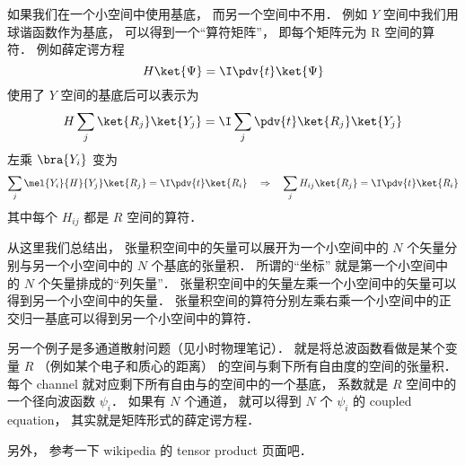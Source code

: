 如果我们在一个小空间中使用基底， 而另一个空间中不用． 例如 $Y$ 空间中我们用球谐函数作为基底， 可以得到一个“算符矩阵”， 即每个矩阵元为 R 空间的算符． 例如薛定谔方程
\begin{equation}
H \ket{\Psi} = \I \pdv{t}  \ket{\Psi}
\end{equation}
使用了 $Y$ 空间的基底后可以表示为
\begin{equation}
H \sum_j \ket{R_j}\ket{Y_j} =  \I  \sum_j\pdv{t}  \ket{R_j}\ket{Y_j}
\end{equation}
左乘 $\bra{Y_i}$ 变为
\begin{equation}
\sum_j \mel{Y_i}{H}{Y_j} \ket{R_j} =  \I  \pdv{t}  \ket{R_i}
\quad\Rightarrow\quad
\sum_j H_{ij} \ket{R_j} =  \I  \pdv{t}  \ket{R_i}
\end{equation}
其中每个 $H_{ij}$ 都是 $R$ 空间的算符．

从这里我们总结出， 张量积空间中的矢量可以展开为一个小空间中的 $N$ 个矢量分别与另一个小空间中的 $N$ 个基底的张量积． 所谓的“坐标” 就是第一个小空间中的 $N$ 个矢量排成的“列矢量”． 张量积空间中的矢量左乘一个小空间中的矢量可以得到另一个小空间中的矢量． 张量积空间的算符分别左乘右乘一个小空间中的正交归一基底可以得到另一个小空间中的算符．

另一个例子是多通道散射问题（见小时物理笔记）． 就是将总波函数看做是某个变量 $R$ （例如某个电子和质心的距离） 的空间与剩下所有自由度的空间的张量积． 每个 channel 就对应剩下所有自由与的空间中的一个基底， 系数就是 $R$ 空间中的一个径向波函数 $\psi_i$． 如果有 $N$ 个通道， 就可以得到 $N$ 个 $\psi_i$ 的 coupled equation， 其实就是矩阵形式的薛定谔方程．

另外， 参考一下 wikipedia 的 tensor product 页面吧．
